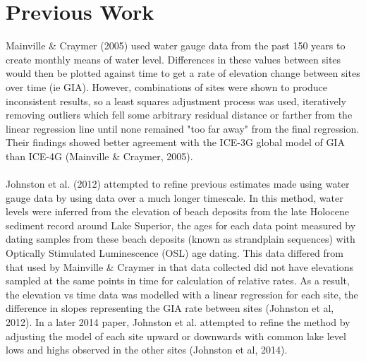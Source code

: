 \section{Previous Work} 
Mainville \& Craymer (2005) used water gauge data from the past 150 years to
 create monthly means of water level. Differences in these values between sites
 would then be plotted against time to get a rate of elevation change between
 sites over time (ie GIA). However, combinations of sites were shown to produce
 inconsistent results, so a least squares adjustment process was used,
 iteratively removing outliers which fell some arbitrary residual distance or
 farther from the linear regression line until none remained "too far away" from
 the final regression. Their findings showed better agreement with the ICE-3G
 global model of GIA than ICE-4G (Mainville \& Craymer, 2005).\\ \\
Johnston et al. (2012) attempted to refine previous estimates made using water
 gauge data by using data over a much longer timescale. In this method, water
 levels were inferred from the elevation of beach deposits from the late Holocene
 sediment record around Lake Superior, the ages for each data point measured by
 dating samples from these beach deposits (known as strandplain sequences) with
 Optically Stimulated Luminescence (OSL) age dating. This data differed from
 that used by Mainville \& Craymer in that data collected did not have
 elevations sampled at the same points in time for calculation of relative
 rates. As a result, the elevation vs time data was modelled with a linear
 regression for each site, the difference in slopes representing the GIA rate
 between sites (Johnston et al, 2012). In a later 2014 paper, Johnston et al.
 attempted to refine the method by adjusting the model of each site upward or 
 downwards with common lake level lows and highs observed in the other sites
 (Johnston et al, 2014).
 
